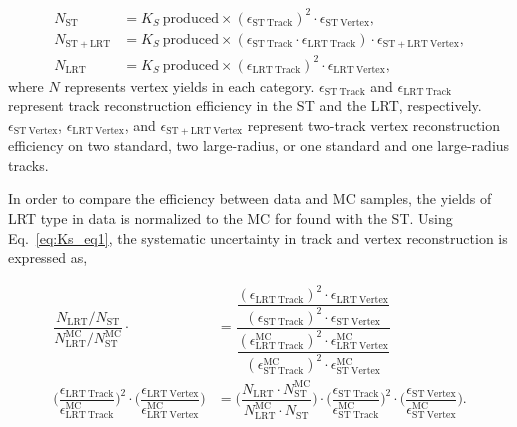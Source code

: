 \begin{align}
    N_{\mathrm{ST}}  &= K_{S}~\mathrm{produced} \times (\epsilon_{\mathrm{ST~Track}})^{2} \cdot \epsilon_{\mathrm{ST~Vertex}}, \nonumber \\
    N_{\mathrm{ST+LRT}}  &= K_{S}~\mathrm{produced} \times (\epsilon_{\mathrm{ST~Track}} \cdot \epsilon_{\mathrm{LRT~Track}}) \cdot \epsilon_{\mathrm{ST+LRT~Vertex}}, \nonumber \\
    N_{\mathrm{LRT}}&= K_{S}~\mathrm{produced} \times (\epsilon_{\mathrm{LRT~Track}})^{2} \cdot \epsilon_{\mathrm{LRT~Vertex}},
\label{eq:Ks_eq1}
\end{align}
%
where $N$ represents vertex yields in each category. $\epsilon_{\mathrm{ST~Track}}$ and $\epsilon_{\mathrm{LRT~Track}}$ represent track reconstruction efficiency in the ST and the LRT, respectively. $\epsilon_{\mathrm{ST~Vertex}}$, $\epsilon_{\mathrm{LRT~Vertex}}$, and $\epsilon_{\mathrm{ST+LRT~Vertex}}$ represent two-track vertex reconstruction efficiency on two standard, two large-radius, or one standard and one large-radius tracks.

In order to compare the efficiency between data and MC samples, the \Ks yields of LRT type in data is normalized to the MC for \Ks found with the ST. Using Eq.~\ref{eq:Ks_eq1}, the systematic uncertainty in track and vertex reconstruction is expressed as,


\begin{align}
    \dfrac{N_{\mathrm{LRT}} / N_{\mathrm{ST}}}{N_{\mathrm{LRT}}^{\mathrm{MC}} / N_{\mathrm{ST}}^{\mathrm{MC}}} \cdot &=
    \dfrac{\dfrac{(\epsilon_{\mathrm{LRT~Track}})^{2} \cdot \epsilon_{\mathrm{LRT~Vertex}}}{(\epsilon_{\mathrm{ST~Track}})^{2} \cdot \epsilon_{\mathrm{ST~Vertex}}}}{\dfrac{(\epsilon_{\mathrm{LRT~Track}}^{\mathrm{MC}})^{2} \cdot \epsilon_{\mathrm{LRT~Vertex}}^{\mathrm{MC}}}{(\epsilon_{\mathrm{ST~Track}}^{\mathrm{MC}})^{2} \cdot \epsilon_{\mathrm{ST~Vertex}}^{\mathrm{MC}}}} 
    \\[10pt]
    \Big( \dfrac{\epsilon_{\mathrm{LRT~Track}}}{\epsilon_{\mathrm{LRT~Track}}^{\mathrm{MC}}}\Big)^{2} \cdot
    \Big( \dfrac{\epsilon_{\mathrm{LRT~Vertex}}}{\epsilon_{\mathrm{LRT~Vertex}}^{\mathrm{MC}}}\Big) &=
    \Big( \dfrac{N_{\mathrm{LRT}} \cdot N_{\mathrm{ST}}^{\mathrm{MC}}}{N_{\mathrm{LRT}}^{\mathrm{MC}} \cdot N_{\mathrm{ST}}} \Big) \cdot
    \Big( \dfrac{\epsilon_{\mathrm{ST~Track}}}{\epsilon_{\mathrm{ST~Track}}^{\mathrm{MC}}}\Big)^{2} \cdot
    \Big( \dfrac{\epsilon_{\mathrm{ST~Vertex}}}{\epsilon_{\mathrm{ST~Vertex}}^{\mathrm{MC}}}\Big).
\label{eq:Ks_eq3}
\end{align}

